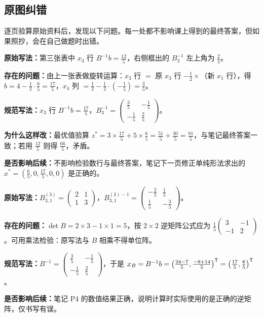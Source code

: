 \subsection*{原图纠错}

逐页验算原始资料后，发现以下问题。每一处都不影响课上得到的最终答案，但如果照抄，会在自己做题时出错。

\begin{correctionbox}
\textbf{原始写法：}第三张表中 $x_3$ 行 $B^{-1}b=\frac{12}{5}$，右侧框出的 $B_3^{-1}$ 左上角为 $\frac25$。\par
\textbf{存在的问题：}由上一张表做旋转运算：$x_3$ 行 $=$ 原 $x_3$ 行 $-\frac12\times$（新 $x_1$ 行），得 $b=4-\frac12\cdot\frac65=\frac{17}{5}$，$x_4$ 列 $=\frac12-\frac12\cdot(-\frac15)=\frac35$。\par
\textbf{规范写法：}$x_3$ 行 $B^{-1}b=\frac{17}{5}$，$B_3^{-1}=\begin{pmatrix}\frac35&-\frac15\\[2pt]-\frac15&\frac25\end{pmatrix}$。\par
\textbf{为什么这样改：}最优值验算 $z^*=3\times\frac{17}{5}+5\times\frac65=\frac{51}{5}+\frac{30}{5}=\frac{81}{5}$，与笔记最终答案一致；若用 $\frac{12}{5}$ 则得 $\frac{66}{5}$，矛盾。\par
\textbf{是否影响后续：}不影响检验数行与最终答案，笔记下一页修正单纯形法求出的 $x^*=(\frac65,0,\frac{17}{5},0,0)$ 是正确的。
\end{correctionbox}

\begin{correctionbox}[纠错 2　手写笔记 P3：$B^{(3)-1}_{3,1}$ 求错]
\textbf{原始写法：}$B_{3,1}^{(3)}=\begin{pmatrix}2&1\\1&3\end{pmatrix}$，$B_{3,1}^{(3)-1}=\begin{pmatrix}-\frac25&\frac15\\[2pt]\frac15&-\frac35\end{pmatrix}$。\par
\textbf{存在的问题：}$\det B=2\times3-1\times1=5$，按 $2\times2$ 逆矩阵公式应为 $\frac15\begin{pmatrix}3&-1\\-1&2\end{pmatrix}$。可用乘法检验：原写法与 $B$ 相乘不得单位阵。\par
\textbf{规范写法：}$B^{-1}=\begin{pmatrix}\frac35&-\frac15\\[2pt]-\frac15&\frac25\end{pmatrix}$，于是 $x_B=B^{-1}b=\left(\frac{24-7}{5},\frac{-8+14}{5}\right)^{\mathsf T}=\left(\frac{17}{5},\frac65\right)^{\mathsf T}$。\par
\textbf{是否影响后续：}笔记 P4 的数值结果正确，说明计算时实际使用的是正确的逆矩阵，仅书写有误。
\end{correctionbox}


